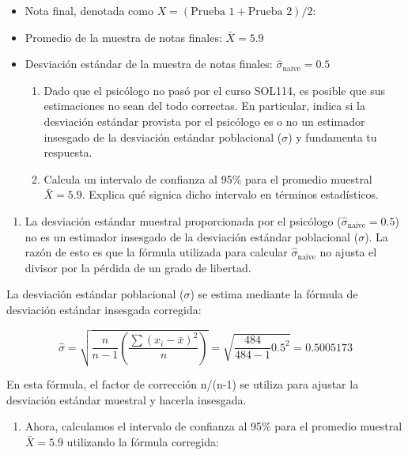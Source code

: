 \documentclass[
  letterpaper,
  DIV=11,
  numbers=noendperiod]{scrartcl}
\providecommand{\tightlist}{%
  \setlength{\itemsep}{0pt}\setlength{\parskip}{0pt}}\usepackage{longtable,booktabs,array}
\begin{document}
\begin{itemize}
\item
  Nota final, denotada como
  \(X = (\text{Prueba 1} + \text{Prueba 2})/2\):
\item
  Promedio de la muestra de notas finales: \(\bar{X} = 5.9\)
\item
  Desviación estándar de la muestra de notas finales:
  \(\hat{\sigma}_{\text{naive}} = 0.5\)

  \begin{enumerate}
  \def\labelenumi{\roman{enumi}.}
  \item
    Dado que el psicólogo no pasó por el curso SOL114, es posible que
    sus estimaciones no sean del todo correctas. En particular, indica
    si la desviación estándar provista por el psicólogo es o no un
    estimador insesgado de la desviación estándar poblacional
    (\(\sigma\)) y fundamenta tu respuesta.
  \item
    Calcula un intervalo de confianza al 95\% para el promedio muestral
    \(\bar{X} = 5.9\). Explica qué signica dicho intervalo en términos
    estadísticos.
  \end{enumerate}
\end{itemize}

\begin{enumerate}
\def\labelenumi{\roman{enumi}.}
\tightlist
\item
  La desviación estándar muestral proporcionada por el psicólogo
  (\(\hat{\sigma}_{\text{naive}} = 0.5\)) no es un estimador insesgado
  de la desviación estándar poblacional (\(\sigma\)). La razón de esto
  es que la fórmula utilizada para calcular
  \(\hat{\sigma}_{\text{naive}}\) no ajusta el divisor por la pérdida de
  un grado de libertad.
\end{enumerate}

La desviación estándar poblacional (\(\sigma\)) se estima mediante la
fórmula de desviación estándar insesgada corregida:

\[\hat{\sigma} = \sqrt{\frac{n}{n-1}\left(\frac{\sum{(x_i - \bar{x})^2}}{n}\right)} = \sqrt{\frac{484}{484-1}0.5^2} = 0.5005173\]

En esta fórmula, el factor de corrección n/(n-1) se utiliza para ajustar
la desviación estándar muestral y hacerla insesgada.

\begin{enumerate}
\def\labelenumi{\roman{enumi}.}
\setcounter{enumi}{1}
\tightlist
\item
  Ahora, calculamos el intervalo de confianza al 95\% para el promedio
  muestral \(\bar{X} = 5.9\) utilizando la fórmula corregida:
\end{enumerate}
\end{document}
